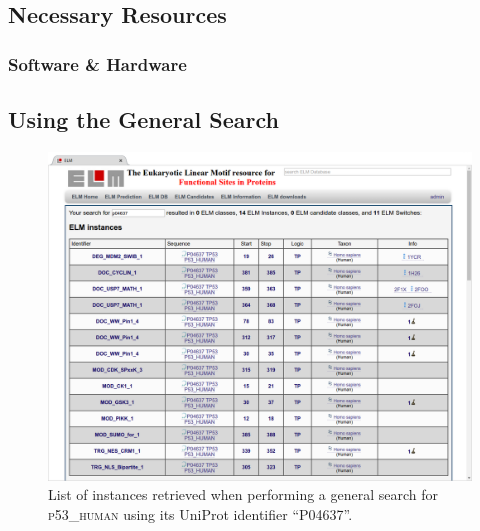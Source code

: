 \documentclass[12pt]{article}
\newcommand\uniprot[1]{%
	\textsc{\lowercase{#1}}%
}
\begin{document}
%
%
\subsection*{Necessary Resources}
\subsubsection*{Software \& Hardware}


%
%
\subsection*{Using the General Search}
\label{subsec:general_search_using}

\begin{enumerate}

\begin{figure}[h!]
	\centering
	\includegraphics[width=\textwidth]{Figures/19_P04637_instances.png}
	\caption{
		List of instances retrieved when performing a general search for
		\uniprot{P53\_HUMAN} using its UniProt identifier ``P04637''.
	}
	\label{fig:general_search_P04637_instances}
\end{figure}


\end{enumerate}
\end{document}
